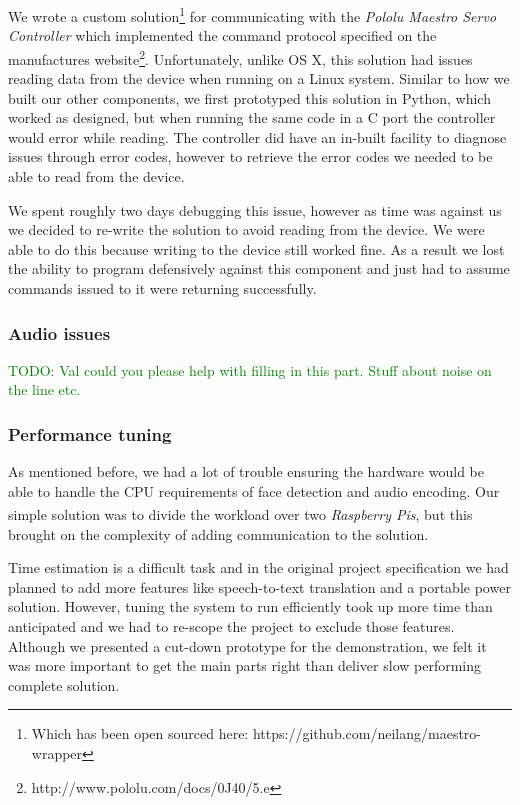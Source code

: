 \documentclass[11pt,a4paper,titlepage]{report}
\newcommand{\rpis}{\textit{Raspberry Pi\textsuperscript{\textregistered}s}}
\begin{document}
We wrote a custom solution\footnote{Which has been open sourced here: https://github.com/neilang/maestro-wrapper} for communicating with the \textit{Pololu Maestro Servo Controller} which implemented the command protocol specified on the manufactures website\footnote{http://www.pololu.com/docs/0J40/5.e}. Unfortunately, unlike OS X, this solution had issues reading data from the device when running on a Linux system. Similar to how we built our other components, we first prototyped this solution in Python, which worked as designed, but when running the same code in a C port the controller would error while reading. The controller did have an in-built facility to diagnose issues through error codes, however to retrieve the error codes we needed to be able to read from the device.

We spent roughly two days debugging this issue, however as time was against us we decided to re-write the solution to avoid reading from the device. We were able to do this because writing to the device still worked fine. As a result we lost the ability to program defensively against this component and just had to assume commands issued to it were returning successfully.

\subsubsection{Audio issues}

\textcolor{green}{TODO: Val could you please help with filling in this part. Stuff about noise on the line etc.}


\subsubsection{Performance tuning}

As mentioned before, we had a lot of trouble ensuring the hardware would be able to handle the CPU requirements of face detection and audio encoding. Our simple solution was to divide the workload over two \rpis, but this brought on the complexity of adding communication to the solution.

Time estimation is a difficult task and in the original project specification we had planned to add more features like speech-to-text translation and a portable power solution. However, tuning the system to run efficiently took up more time than anticipated and we had to re-scope the project to exclude those features. Although we presented a cut-down prototype for the demonstration, we felt it was more important to get the main parts right than deliver slow performing complete solution.
\end{document}
